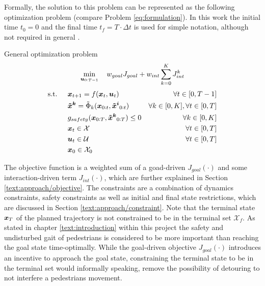 Formally, the solution to this problem can be represented as the following optimization problem (compare Problem \ref{eq:formulation}). In this work the initial time $t_0 = 0$ and the final time $t_f = T \cdot \Delta t$ is used for simple notation, although not required in general \cite{Wachter2006}. \\

\begin{problem} General \project optimization problem
\begin{equation}
\min_{\boldsymbol{u}_{0:T-1}} \quad w_{goal} J_{goal} + w_{int} \sum_{k=0}^K J_{int}^k
\end{equation}
\begin{align}
\textrm{s.t. } \quad & \x_{t+1} = f(\x_t, \u_t) & \forall t \in [0, T - 1] \\
& \xped[k] = \tilde{\Phi}_k(\x_{0:t}, \xped[i]_{0:t}) & \forall k \in [0, K], \forall t \in [0, T]\\
& g_{safety}(\x_{0:T}, \xped[k]_{0:T}) \leq 0 & \forall k \in [0, K] \\
& \x_t \in \mathcal{X} & \forall t \in [0, T]\\
& \u_t \in \mathcal{U} & \forall t \in [0, T]\\
& \x_0 \in \mathcal{X}_0
\end{align} 
\label{eq:formulation}
\end{problem}

The objective function is a weighted sum of a goad-driven $J_{goal}(\cdot)$ and some interaction-driven term $J_{int}(\cdot)$, which are further explained in Section \ref{text:approach/objective}. The constraints are a combination of dynamics constraints, safety constraints as well as initial and final state restrictions, which are discussed in Section \ref{text:approach/constraint}. Note that the terminal state $\boldsymbol{x}_T$ of the planned trajectory is not constrained to be in the terminal set $\mathcal{X}_f$. As stated in chapter \ref{text:introduction} within this project the safety and undisturbed gait of pedestrians is considered to be more important than reaching the goal state time-optimally. While the goal-driven objective $J_{goal}(\cdot)$ introduces an incentive to approach the goal state, constraining the terminal state to be in the terminal set would informally speaking, remove the possibility of detouring to not interfere a pedestrians movement. 

